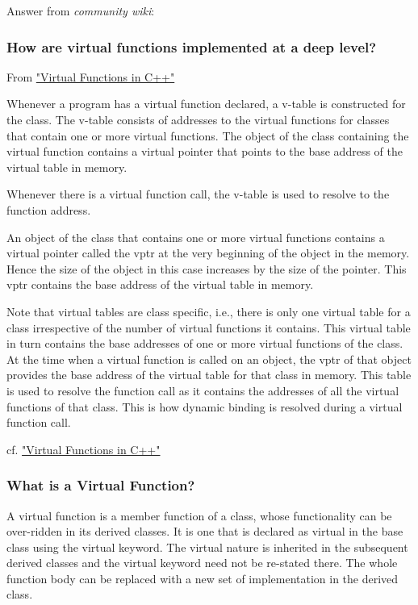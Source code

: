 \documentclass[10pt]{amsart}
\begin{document}
Answer from \emph{community wiki}:  

\subsubsection{How are virtual functions implemented at a deep level?}

From \href{http://wayback.archive.org/web/20100209040010/http://www.codersource.net/published/view/325/virtual_functions_in.aspx}{"Virtual Functions in C++"}

Whenever a program has a virtual function declared, a v-table is constructed for the class. The v-table consists of addresses to the virtual functions for classes that contain one or more virtual functions. The object of the class containing the virtual function contains a virtual pointer that points to the base address of the virtual table in memory.   

Whenever there is a virtual function call, the v-table is used to resolve to the function address. 

An object of the class that contains one or more virtual functions contains a virtual pointer called the vptr at the very beginning of the object in the memory. Hence the size of the object in this case increases by the size of the pointer. This vptr contains the base address of the virtual table in memory.  

Note that virtual tables are class specific, i.e., there is only one virtual table for a class irrespective of the number of virtual functions it contains. This virtual table in turn contains the base addresses of one or more virtual functions of the class. At the time when a virtual function is called on an object, the vptr of that object provides the base address of the virtual table for that class in memory. This table is used to resolve the function call as it contains the addresses of all the virtual functions of that class. This is how dynamic binding is resolved during a virtual function call.

cf. \href{http://wayback.archive.org/web/20100209040010/http://www.codersource.net/published/view/325/virtual_functions_in.aspx}{"Virtual Functions in C++"}

\subsubsection{What is a Virtual Function?}  

A virtual function is a member function of a class, whose functionality can be over-ridden in its derived classes. It is one that is declared as virtual in the base class using the virtual keyword. The virtual nature is inherited in the subsequent derived classes and the virtual keyword need not be re-stated there. The whole function body can be replaced with a new set of implementation in the derived class. 
\end{document}
